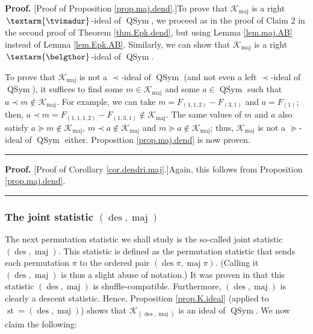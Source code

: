 \documentclass[numbers=enddot,12pt,final,onecolumn,notitlepage]{scrartcl}%
\theoremstyle{definition}
\newenvironment{proof}[1][Proof]{\noindent\textbf{#1.} }{\ \rule{0.5em}{0.5em}}
\newcommand{\tvi}{\left. \textarm{\tvimadur} \right.}
\newcommand{\bel}{\left. \textarm{\belgthor} \right.}
\begin{document}
\begin{proof}
[Proof of Proposition \ref{prop.maj.dend}.]To prove that $\mathcal{K}%
_{\operatorname*{maj}}$ is a right $\tvi$-ideal of $\operatorname*{QSym}$, we
proceed as in the proof of Claim 2 in the second proof of Theorem
\ref{thm.Epk.dend}, but using Lemma \ref{lem.maj.AB} instead of Lemma
\ref{lem.Epk.AB}. Similarly, we can show that $\mathcal{K}%
_{\operatorname*{maj}}$ is a right $\bel$-ideal of $\operatorname*{QSym}$.

To prove that $\mathcal{K}_{\operatorname*{maj}}$ is not a $\left.
\prec\right.  $-ideal of $\operatorname*{QSym}$ (and not even a left $\left.
\prec\right.  $-ideal of $\operatorname*{QSym}$), it suffices to find some
$m\in\mathcal{K}_{\operatorname*{maj}}$ and some $a\in\operatorname*{QSym}$
such that $a\left.  \prec\right.  m\notin\mathcal{K}_{\operatorname*{maj}}$.
For example, we can take $m=F_{\left(  1,1,2\right)  }-F_{\left(  3,1\right)
}$ and $a=F_{\left(  1\right)  }$; then, $a\left.  \prec\right.  m=F_{\left(
1,1,1,2\right)  }-F_{\left(  1,3,1\right)  }\notin\mathcal{K}%
_{\operatorname*{maj}}$. The same values of $m$ and $a$ also satisfy $a\left.
\succeq\right.  m\notin\mathcal{K}_{\operatorname*{maj}}$, $m\left.
\prec\right.  a\notin\mathcal{K}_{\operatorname*{maj}}$ and $m\left.
\succeq\right.  a\notin\mathcal{K}_{\operatorname*{maj}}$; thus,
$\mathcal{K}_{\operatorname*{maj}}$ is not a $\left.  \succeq\right.  $-ideal
of $\operatorname*{QSym}$ either. Proposition \ref{prop.maj.dend} is now proven.
\end{proof}

\begin{proof}
[Proof of Corollary \ref{cor.dendri.maj}.]Again, this follows from Proposition
\ref{prop.maj.dend}.
\end{proof}

\subsubsection{The joint statistic $\left(  \operatorname*{des}%
,\operatorname*{maj}\right)  $}

The next permutation statistic we shall study is the so-called joint statistic
$\left(  \operatorname*{des},\operatorname*{maj}\right)  $. This statistic is
defined as the permutation statistic that sends each permutation $\pi$ to the
ordered pair $\left(  \operatorname*{des}\pi,\operatorname*{maj}\pi\right)  $.
(Calling it $\left(  \operatorname*{des},\operatorname*{maj}\right)  $ is thus
a slight abuse of notation.) It was proven in \cite[Theorem 4.5 \textbf{(a)}%
]{part1} that this statistic $\left(  \operatorname*{des},\operatorname*{maj}%
\right)  $ is shuffle-compatible. Furthermore, $\left(  \operatorname*{des}%
,\operatorname*{maj}\right)  $ is clearly a descent statistic. Hence,
Proposition \ref{prop.K.ideal} (applied to $\operatorname*{st}=\left(
\operatorname*{des},\operatorname*{maj}\right)  $) shows that $\mathcal{K}%
_{\left(  \operatorname*{des},\operatorname*{maj}\right)  }$ is an ideal of
$\operatorname*{QSym}$. We now claim the following:
\end{document}
